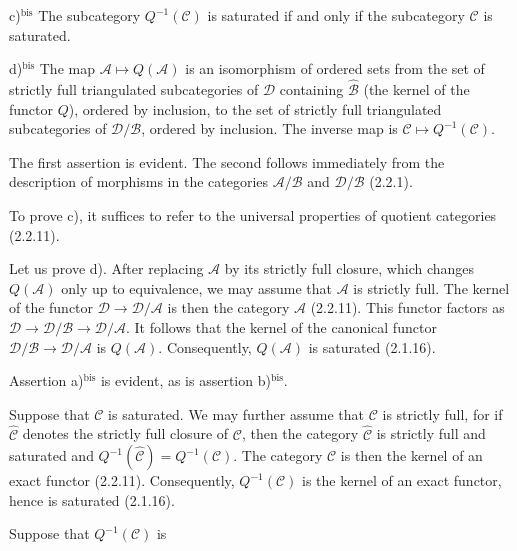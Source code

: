 \par\noindent c)$^{\mathrm{bis}}$ The subcategory $Q^{-1}(\mathcal C)$ is
saturated if and only if the subcategory $\mathcal C$ is saturated.

\par\noindent d)$^{\mathrm{bis}}$ The map
$\mathcal A\longmapsto Q(\mathcal A)$ is an isomorphism of ordered sets
from the set of strictly full triangulated subcategories of $\mathcal D$
containing $\widehat{\mathcal B}$ (the kernel of the functor $Q$), ordered
by inclusion, to the set of strictly full triangulated subcategories of
$\mathcal D/\mathcal B$, ordered by inclusion. The inverse map is
$\mathcal C\longmapsto Q^{-1}(\mathcal C)$.
\endgroup

The first assertion is evident. The second follows immediately from the
description of morphisms in the categories $\mathcal A/\mathcal B$ and
$\mathcal D/\mathcal B$ (2.2.1).

To prove c), it suffices to refer to the universal properties of quotient
categories (2.2.11).

Let us prove d). After replacing $\mathcal A$ by its strictly full closure,
which changes $Q(\mathcal A)$ only up to equivalence, we may assume that
$\mathcal A$ is strictly full. The kernel of the functor
$\mathcal D\longrightarrow\mathcal D/\mathcal A$ is then the category
$\mathcal A$ (2.2.11). This functor factors as
$\mathcal D\longrightarrow\mathcal D/\mathcal B
\longrightarrow\mathcal D/\mathcal A$. It follows that the kernel of the
canonical functor
$\mathcal D/\mathcal B\longrightarrow\mathcal D/\mathcal A$ is
$Q(\mathcal A)$. Consequently, $Q(\mathcal A)$ is saturated (2.1.16).

Assertion a)$^{\mathrm{bis}}$ is evident, as is assertion
b)$^{\mathrm{bis}}$.

Suppose that $\mathcal C$ is saturated. We may further assume that
$\mathcal C$ is strictly full, for if $\widehat{\mathcal C}$ denotes the
strictly full closure of $\mathcal C$, then the category
$\widehat{\mathcal C}$ is strictly full and saturated and
$Q^{-1}(\widehat{\mathcal C})=Q^{-1}(\mathcal C)$. The category
$\mathcal C$ is then the kernel of an exact functor (2.2.11).
Consequently, $Q^{-1}(\mathcal C)$ is the kernel of an exact functor, hence
is saturated (2.1.16).

Suppose that $Q^{-1}(\mathcal C)$ is
\endgroup
